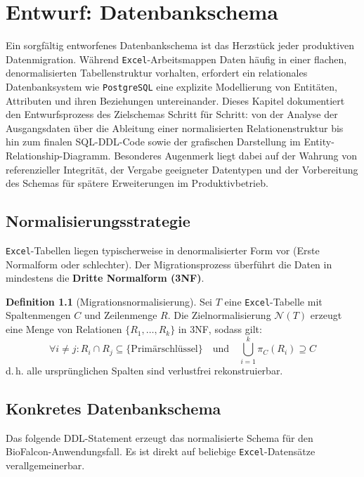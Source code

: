 \documentclass[12pt,a4paper]{report}
\theoremstyle{definition}
\newtheorem{definition}{Definition}[section]
\theoremstyle{remark}
\newcommand{\excel}{\texttt{Excel}}
\newcommand{\pg}{\texttt{PostgreSQL}}
\begin{document}
\chapter{Entwurf: Datenbankschema}

Ein sorgfältig entworfenes Datenbankschema ist das Herzstück jeder produktiven Datenmigration. Während \excel{}-Arbeitsmappen Daten häufig in einer flachen, denormalisierten Tabellenstruktur vorhalten, erfordert ein relationales Datenbanksystem wie \pg{} eine explizite Modellierung von Entitäten, Attributen und ihren Beziehungen untereinander. Dieses Kapitel dokumentiert den Entwurfsprozess des Zielschemas Schritt für Schritt: von der Analyse der Ausgangsdaten über die Ableitung einer normalisierten Relationenstruktur bis hin zum finalen SQL-DDL-Code sowie der grafischen Darstellung im Entity-Relationship-Diagramm. Besonderes Augenmerk liegt dabei auf der Wahrung von referenzieller Integrität, der Vergabe geeigneter Datentypen und der Vorbereitung des Schemas für spätere Erweiterungen im Produktivbetrieb.

\section{Normalisierungsstrategie}
\excel-Tabellen liegen typischerweise in denormalisierter Form vor
(Erste Normalform oder schlechter). Der Migrationsprozess überführt
die Daten in mindestens die \textbf{Dritte Normalform (3NF)}.

\begin{definition}[Migrationsnormalisierung]
  Sei $T$ eine \excel-Tabelle mit Spaltenmengen $C$ und Zeilenmenge $R$.
  Die Zielnormalisierung $\mathcal{N}(T)$ erzeugt eine Menge von
  Relationen $\{R_1, \ldots, R_k\}$ in 3NF, sodass gilt:
  \[
    \forall i \neq j: R_i \cap R_j \subseteq \{\text{Primärschlüssel}\}
    \quad\text{und}\quad
    \bigcup_{i=1}^{k} \pi_{C}(R_i) \supseteq C
  \]
  d.\,h. alle ursprünglichen Spalten sind verlustfrei rekonstruierbar.
\end{definition}

\section{Konkretes Datenbankschema}

Das folgende DDL-Statement erzeugt das normalisierte Schema für den
BioFalcon-Anwen\-dungsfall. Es ist direkt auf beliebige \excel-Datensätze
verallgemeinerbar.
\end{document}

